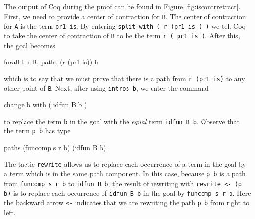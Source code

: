 The output of Coq during the proof can be found in Figure
\ref{fig:iscontrretract}.  First, we need to provide a center of contraction for \verb|B|.
The center of contraction for \verb|A| is the term 
\verb|pr1 is|. By entering 
\verb|split with ( r (pr1 is ) )| we tell Coq to take
the center of contraction of \verb|B| to be the term
\verb|r ( pr1 is )|.  After this, the goal becomes
\begin{center}
  \begin{coqcode}
forall b : B, paths (r (pr1 is)) b
  \end{coqcode}
\end{center}
which is to say that we must prove that there is a path from
\verb|r (pr1 is)| to any other point of \verb|B|.  Next,
after using \verb|intros b|, we enter the command 
\begin{center}
  \begin{coqcode}
change b with ( idfun B b )
  \end{coqcode}
\end{center}
to replace the term \verb|b| in the goal with the \emph{equal}
term
\verb|idfun B b|.  Observe that the term \verb|p b| has type
\begin{center}
  \begin{coqcode}
paths (funcomp s r b) (idfun B b).
  \end{coqcode}
\end{center}
The tactic \verb|rewrite| allows us to replace each occurrence of
a term in the goal by a term which is in the same path component.
In this case, because \verb|p b| is a path from
\verb|funcomp s r b| to \verb|idfun B b|, the result of
rewriting with \verb|rewrite <- (p b)| is to replace each
occurrence of \verb|idfun B b| in the goal by 
\verb|funcomp s r b|.  Here the backward arrow \verb|<-|
indicates that we are rewriting the path \verb|p b| from right to
left.
